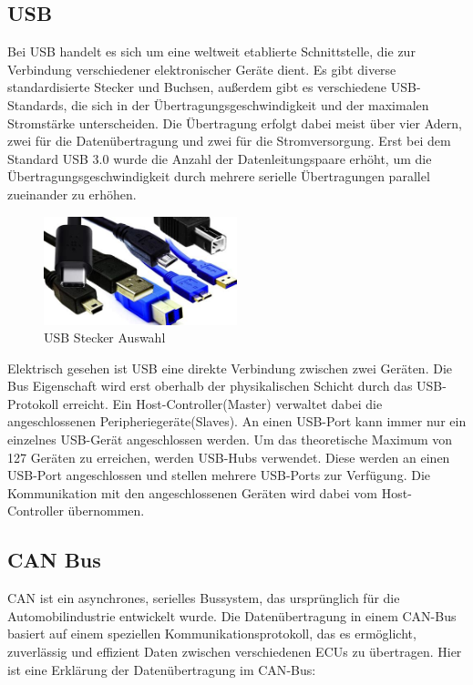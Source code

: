 \subsection{\Ac{USB}}
Bei \ac{USB} handelt es sich um eine weltweit etablierte Schnittstelle, die zur Verbindung verschiedener
elektronischer Geräte dient. Es gibt diverse standardisierte Stecker und Buchsen, außerdem gibt es verschiedene
\ac{USB}-Standards, die sich in der Übertragungsgeschwindigkeit und der maximalen Stromstärke unterscheiden.
Die Übertragung erfolgt dabei meist über vier Adern, zwei für die Datenübertragung und zwei für die Stromversorgung.
Erst bei dem Standard USB 3.0 wurde die Anzahl der Datenleitungspaare erhöht, um die Übertragungsgeschwindigkeit durch
mehrere serielle Übertragungen parallel zueinander zu erhöhen.
\begin{figure}[H]
    \centering
    \includegraphics[width=0.5\textwidth]{resources/images/usb.png}
    \caption[\ac{USB} Stecker]{\ac{USB} Stecker Auswahl\cite{usb}}
    \label{fig:usb}
\end{figure}
Elektrisch gesehen ist \ac{USB} eine direkte Verbindung zwischen zwei Geräten. Die Bus Eigenschaft wird erst oberhalb der
physikalischen Schicht durch das \ac{USB}-Protokoll erreicht. Ein Host-Controller(Master) verwaltet dabei die angeschlossenen
Peripheriegeräte(Slaves). An einen \ac{USB}-Port kann immer nur ein einzelnes \ac{USB}-Gerät angeschlossen werden. Um das
theoretische Maximum von 127 Geräten zu erreichen, werden \ac{USB}-Hubs verwendet. Diese werden an einen \ac{USB}-Port
angeschlossen und stellen mehrere \ac{USB}-Ports zur Verfügung. Die Kommunikation mit den angeschlossenen Geräten wird dabei
vom Host-Controller übernommen.

\subsection{\Ac{CAN} Bus}
\ac{CAN} ist ein asynchrones, serielles Bussystem, das ursprünglich für die Automobilindustrie entwickelt wurde.
Die Datenübertragung in einem \ac{CAN}-Bus basiert auf einem speziellen Kommunikationsprotokoll,
das es ermöglicht, zuverlässig und effizient Daten zwischen verschiedenen \acp{ECU} zu übertragen.
Hier ist eine Erklärung der Datenübertragung im \ac{CAN}-Bus:

